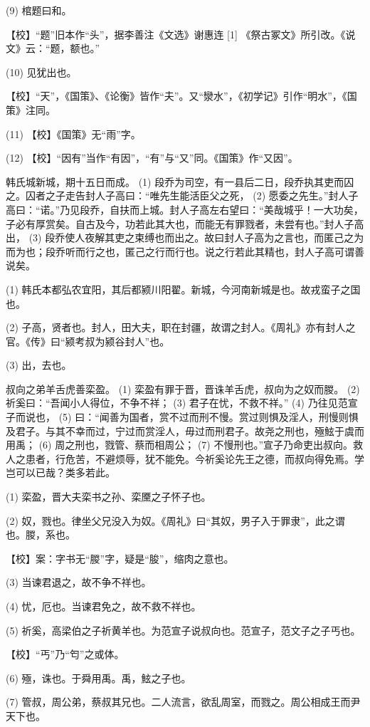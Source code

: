 \documentclass[12pt,UTF8]{ctexbook}
\begin{document}
(9) 棺题曰和。

【校】“题”旧本作“头”，据李善注《文选》谢惠连 [1] 《祭古冢文》所引改。《说文》云：“题，额也。”

(10) 见犹出也。

【校】“天”，《国策》、《论衡》皆作“夫”。又“灓水”，《初学记》引作“明水”，《国策》注同。

(11) 【校】《国策》无“雨”字。

(12) 【校】“因有”当作“有因”，“有”与“又”同。《国策》作“又因”。

韩氏城新城，期十五日而成。 (1) 段乔为司空，有一县后二日，段乔执其吏而囚之。囚者之子走告封人子高曰：“唯先生能活臣父之死， (2) 愿委之先生。”封人子高曰：“诺。”乃见段乔，自扶而上城。封人子高左右望曰：“美哉城乎！一大功矣，子必有厚赏矣。自古及今，功若此其大也，而能无有罪戮者，未尝有也。”封人子高出， (3) 段乔使人夜解其吏之束缚也而出之。故曰封人子高为之言也，而匿己之为而为也；段乔听而行之也，匿己之行而行也。说之行若此其精也，封人子高可谓善说矣。

(1) 韩氏本都弘农宜阳，其后都颍川阳翟。新城，今河南新城是也。故戎蛮子之国也。

(2) 子高，贤者也。封人，田大夫，职在封疆，故谓之封人。《周礼》亦有封人之官。《传》曰“颍考叔为颍谷封人”也。

(3) 出，去也。

叔向之弟羊舌虎善栾盈。 (1) 栾盈有罪于晋，晋诛羊舌虎，叔向为之奴而朡。 (2) 祈奚曰：“吾闻小人得位，不争不祥； (3) 君子在忧，不救不祥。” (4) 乃往见范宣子而说也， (5) 曰：“闻善为国者，赏不过而刑不慢。赏过则惧及淫人，刑慢则惧及君子。与其不幸而过，宁过而赏淫人，毋过而刑君子。故尧之刑也，殛鮌于虞而用禹； (6) 周之刑也，戮管、蔡而相周公； (7) 不慢刑也。”宣子乃命吏出叔向。救人之患者，行危苦，不避烦辱，犹不能免。今祈奚论先王之德，而叔向得免焉。学岂可以已哉？类多若此。

(1) 栾盈，晋大夫栾书之孙、栾黡之子怀子也。

(2) 奴，戮也。律坐父兄没入为奴。《周礼》曰“其奴，男子入于罪隶”，此之谓也。朡，系也。

【校】案：字书无“朡”字，疑是“朘”，缩肉之意也。

(3) 当谏君退之，故不争不祥也。

(4) 忧，厄也。当谏君免之，故不救不祥也。

(5) 祈奚，高梁伯之子祈黄羊也。为范宣子说叔向也。范宣子，范文子之子丐也。

【校】“丐”乃“匄”之或体。

(6) 殛，诛也。于舜用禹。禹，鮌之子也。

(7) 管叔，周公弟，蔡叔其兄也。二人流言，欲乱周室，而戮之。周公相成王而尹天下也。
\end{document}

